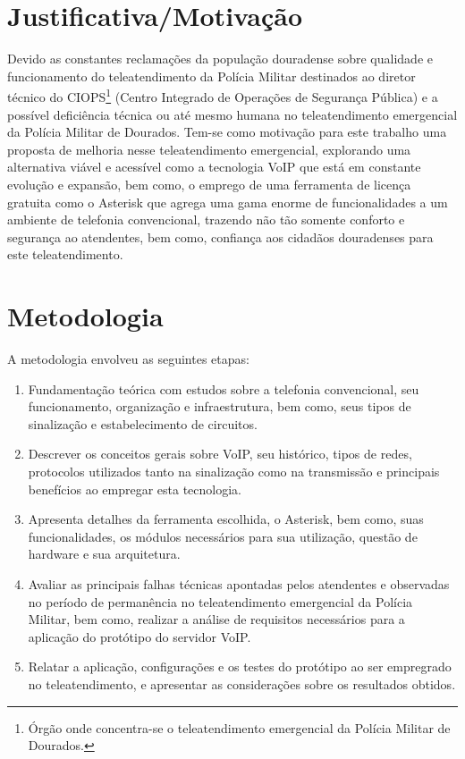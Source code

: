 \section{Justificativa/Motivação}
Devido as constantes reclamações da população douradense sobre qualidade e funcionamento do teleatendimento da Polícia Militar destinados ao diretor técnico do CIOPS\footnote{Órgão onde concentra-se o teleatendimento emergencial da Polícia Militar de Dourados.} (Centro Integrado de Operações de Segurança Pública) e a possível deficiência técnica ou até mesmo humana no teleatendimento emergencial da Polícia Militar de Dourados. Tem-se como motivação para este trabalho uma proposta de melhoria nesse teleatendimento emergencial, explorando uma alternativa viável e acessível como a tecnologia VoIP que está em constante evolução e expansão, bem como, o emprego de uma ferramenta de licença gratuita como o Asterisk que agrega uma gama enorme de funcionalidades a um ambiente de telefonia convencional, trazendo não tão somente conforto e segurança ao atendentes, bem como, confiança aos cidadãos douradenses para este teleatendimento.

\section{Metodologia}
A metodologia envolveu as seguintes etapas:
\begin{enumerate}
  \item Fundamentação teórica com estudos sobre a telefonia convencional, seu funcionamento, organização e infraestrutura, bem como, seus tipos de sinalização e estabelecimento de circuitos.
  \item Descrever os conceitos gerais sobre VoIP, seu histórico, tipos de redes, protocolos utilizados tanto na sinalização como na transmissão e principais benefícios ao empregar esta tecnologia.
  \item Apresenta detalhes da ferramenta escolhida, o Asterisk, bem como, suas funcionalidades, os módulos necessários para sua utilização, questão de hardware e sua arquitetura.
  \item Avaliar as principais falhas técnicas apontadas pelos atendentes e observadas no período de permanência no teleatendimento emergencial da Polícia Militar, bem como, realizar a análise de requisitos necessários para a aplicação do protótipo do servidor VoIP.
  \item Relatar a aplicação, configurações e os testes do protótipo ao ser empregrado no teleatendimento, e apresentar as considerações sobre os resultados obtidos.
\end{enumerate}


